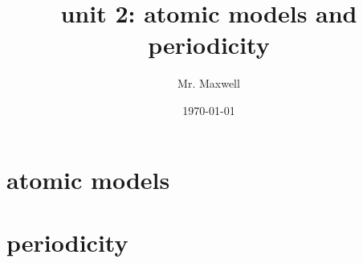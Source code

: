 \documentclass[11pt]{article}
\author{Mr. Maxwell}
\date{\today}
\title{unit 2: atomic models and periodicity}
\begin{document}
\maketitle
\tableofcontents


\section{atomic models}
\label{sec:orgd01b535}

\section{periodicity}
\label{sec:org9a396db}
\end{document}
